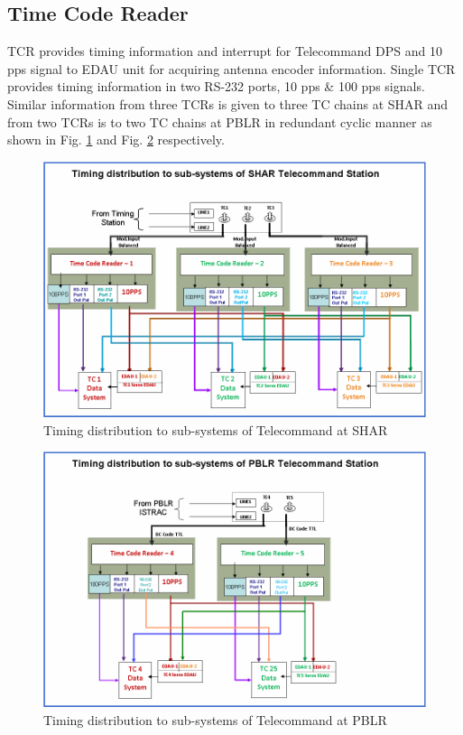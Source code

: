 \subsection{Time Code Reader}
TCR provides timing information and interrupt for Telecommand DPS and 10 pps signal to EDAU unit for acquiring antenna encoder information. Single TCR provides timing information in two RS-232 ports, 10 pps \& 100 pps signals. Similar information from three TCRs is given to three TC chains at SHAR and from two TCRs is to two TC chains at PBLR in redundant cyclic manner as shown in Fig. \ref{FIG:SHARTIMINGDIST} and Fig. \ref{FIG:PBLRTIMINGDIST} respectively.

\begin{figure}[H]
	\centering
	\includegraphics[width=0.9\linewidth]{./Diagrams/SharTimingDistribution.png}
	\caption{Timing distribution to sub-systems of Telecommand at SHAR}
	\label{FIG:SHARTIMINGDIST}
\end{figure}

\begin{figure}[H]
	\centering
	\includegraphics[width=0.9\linewidth]{./Diagrams/PBLRTimingDistribution.png}
	\caption{Timing distribution to sub-systems of Telecommand at PBLR}
	\label{FIG:PBLRTIMINGDIST}
\end{figure}


